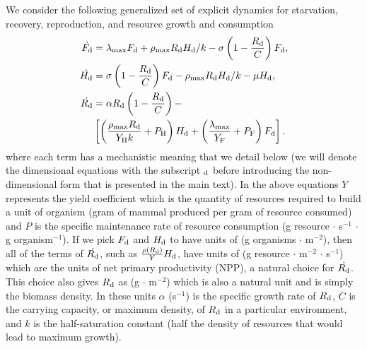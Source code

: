 \documentclass[twocolumn,preprintnumbers,amsmath,amssymb,superscriptaddress]{revtex4}
\begin{document}
{We consider the following generalized set of explicit dynamics for starvation, recovery, reproduction, and resource growth and consumption
\begin{align}
\begin{split}
\dot{F_{\rm d}} &= \lambda_{\rm \text{max}} F_{\rm d} + \rho_{\rm \text{max}}R_{\rm d}H_{\rm d}/k - \sigma \left(1-\frac{R_{\rm d}}{C}\right)F_{\rm d},  \\
\dot{H_{\rm d}} &= \sigma \left(1-\frac{R_{\rm d}}{C}\right)F_{\rm d} - \rho_{\rm \text{max}}R_{\rm d} H_{\rm d}/k - \mu H_{\rm d},  \\
\dot{R_{\rm d}} &= \alpha R_{\rm d}\left(1-\frac{R_{\rm d}}{C}\right) -\\
& \left[\left(\frac{\rho_{\rm \text{max}}R_{\rm d}}{Y_{\rm H}k}+P_{\rm H}\right)H_{\rm d}+\left(\frac{\lambda_{\rm \text{max}}}{Y_{\rm F}}+P_{\rm F}\right)F_{\rm d}\right].
\label{bigdynamics}
\end{split}
\end{align}
where each term has a mechanistic meaning that we detail below (we will denote the dimensional equations with the subscript $_{\rm d}$ before introducing the non-dimensional form that is presented in the main text). In the above equations $Y$ represents the yield coefficient \citep{pirt,Heijnen} which is the quantity of resources required to build a unit of organism (gram of mammal produced per gram of resource consumed) and $P$ is the specific maintenance rate of resource consumption (g resource $\cdot$ s$^{-1}$ $\cdot$ g organism$^{-1}$). If we pick $F_{\rm d}$ and $H_{\rm d}$ to have units of (g organisms $\cdot$ m$^{-2}$), then all of the terms of $\dot{R_{\rm d}}$, such as $\frac{\rho\left(R_{\rm d}\right)}{Y}H_{\rm d}$, have units of (g resource $\cdot$ m$^{-2}$ $\cdot$ s$^{-1}$) which are the units of net primary productivity (NPP), a natural choice for $\dot{R_{\rm d}}$. This choice also gives $R_{\rm d}$ as (g $\cdot$ m$^{-2}$) which is also a natural unit and is simply the biomass density. In these units $\alpha$ (s$^{-1}$) is the specific growth rate of $R_{\rm d}$, $C$ is the carrying capacity, or maximum density, of $R_{\rm d}$ in a particular environment, and $k$ is the half-saturation constant (half the density of resources that would lead to maximum growth).

}
\end{document}
